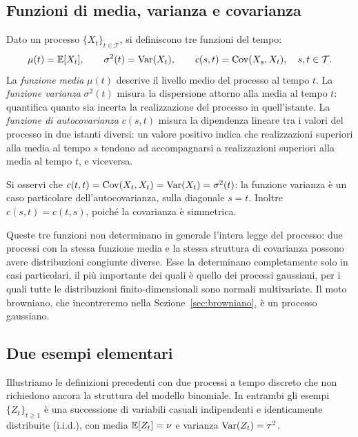 \subsection{Funzioni di media, varianza e covarianza}

\noindent
Dato un processo $\{X_t\}_{t\in\mathcal{T}}$, si definiscono tre
funzioni del tempo:
\[
\mu(t)=\mathbb{E}[X_t], \qquad
\sigma^2(t)=\operatorname{Var}(X_t), \qquad
c(s,t)=\operatorname{Cov}(X_s,X_t), \quad s,t\in\mathcal{T}.
\]
La \emph{funzione media} $\mu(t)$ descrive il livello medio del
processo al tempo $t$. La \emph{funzione varianza} $\sigma^2(t)$
misura la dispersione attorno alla media al tempo $t$: quantifica
quanto sia incerta la realizzazione del processo in quell'istante.
La \emph{funzione di autocovarianza} $c(s,t)$ misura la dipendenza
lineare tra i valori del processo in due istanti diversi: un valore
positivo indica che realizzazioni superiori alla media al tempo $s$
tendono ad accompagnarsi a realizzazioni superiori alla media al
tempo $t$, e viceversa.

Si osservi che $c(t,t)=\operatorname{Cov}(X_t,X_t)=\operatorname{Var}(X_t)=\sigma^2(t)$: la
funzione varianza \`{e} un caso particolare dell'autocovarianza, sulla
diagonale $s=t$. Inoltre $c(s,t)=c(t,s)$, poich\'{e} la covarianza
\`{e} simmetrica.

\begin{remark}
Queste tre funzioni non determinano in generale l'intera legge del
processo: due processi con la stessa funzione media e la stessa
struttura di covarianza possono avere distribuzioni congiunte diverse.
Esse la determinano completamente solo in casi particolari, il
pi\`{u} importante dei quali \`{e} quello dei processi gaussiani, per
i quali tutte le distribuzioni finito-dimensionali sono normali
multivariate. Il moto browniano, che incontreremo nella
Sezione~\ref{sec:browniano}, \`{e} un processo gaussiano.
\end{remark}

\subsection{Due esempi elementari}

\noindent
Illustriamo le definizioni precedenti con due processi a tempo
discreto che non richiedono ancora la struttura del modello binomiale.
In entrambi gli esempi $\{Z_t\}_{t\geq 1}$ \`{e} una successione di
variabili casuali indipendenti e identicamente distribuite (i.i.d.),
con media $\mathbb{E}[Z_t]=\nu$ e varianza $\operatorname{Var}(Z_t)=\tau^2$.

